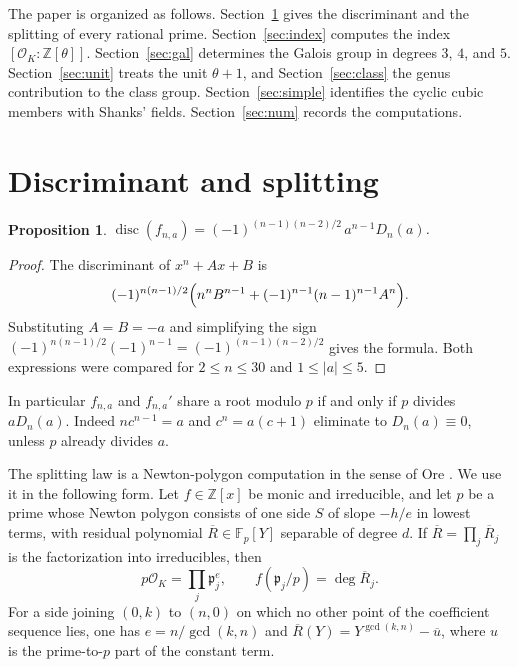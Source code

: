 \documentclass[11pt]{article}
\newtheorem{proposition}[theorem]{Proposition}
\theoremstyle{definition}
\theoremstyle{remark}
\newcommand{\Z}{\mathbb{Z}}
\newcommand{\F}{\mathbb{F}}
\newcommand{\OK}{\mathcal{O}_K}
\newcommand{\disc}{\operatorname{disc}}
\begin{document}
The paper is organized as follows. Section~\ref{sec:disc} gives the discriminant
and the splitting of every rational prime. Section~\ref{sec:index} computes the
index $[\OK:\Z[\theta]]$. Section~\ref{sec:gal} determines the Galois group in
degrees $3$, $4$, and $5$. Section~\ref{sec:unit} treats the unit $\theta+1$, and
Section~\ref{sec:class} the genus contribution to the class group.
Section~\ref{sec:simple} identifies the cyclic cubic members with Shanks' fields.
Section~\ref{sec:num} records the computations.

\section{Discriminant and splitting}\label{sec:disc}

\begin{proposition}\label{prop:disc}
$\displaystyle \disc(f_{n,a})=(-1)^{(n-1)(n-2)/2}\,a^{n-1}D_n(a)$.
\end{proposition}

\begin{proof}
The discriminant of $x^{n}+Ax+B$ is
\[
(-1)^{n(n-1)/2}\Bigl(n^{n}B^{n-1}+(-1)^{n-1}(n-1)^{n-1}A^{n}\Bigr).
\]
Substituting $A=B=-a$ and simplifying the sign
$(-1)^{n(n-1)/2}(-1)^{n-1}=(-1)^{(n-1)(n-2)/2}$ gives the formula. Both expressions
were compared for $2\le n\le 30$ and $1\le|a|\le 5$.
\end{proof}

In particular $f_{n,a}$ and $f_{n,a}'$ share a root modulo $p$ if and only if
$p$ divides $aD_n(a)$. Indeed $nc^{n-1}=a$ and $c^{n}=a(c+1)$ eliminate to
$D_n(a)\equiv 0$, unless $p$ already divides $a$.

The splitting law is a Newton-polygon computation in the sense of Ore
\cite{Ore}. We use it in the following form. Let $f\in\Z[x]$ be monic and
irreducible, and let $p$ be a prime whose Newton polygon consists of one side $S$
of slope $-h/e$ in lowest terms, with residual polynomial $\overline{R}\in\F_p[Y]$
separable of degree $d$. If $\overline{R}=\prod_j\overline{R}_j$ is the
factorization into irreducibles, then
\[
p\OK=\prod_j\mathfrak{p}_j^{e},\qquad f(\mathfrak{p}_j/p)=\deg\overline{R}_j.
\]
For a side joining $(0,k)$ to $(n,0)$ on which no other point of the coefficient
sequence lies, one has $e=n/\gcd(k,n)$ and
$\overline{R}(Y)=Y^{\gcd(k,n)}-\overline{u}$, where $u$ is the prime-to-$p$ part
of the constant term.
\end{document}
